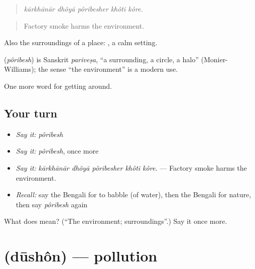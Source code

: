 \begin{quote}
    
\end{quote}

\begin{quote}
\emph{kārkhānār dhõyā pôribesher khôti kôre.}
\end{quote}

\begin{quote}
Factory smoke harms the environment.
\end{quote}

Also the surroundings of a place:  , a calm setting.

\begin{cousinweb}
\textbf{} (\emph{pôribesh}) is Sanskrit \emph{pariveṣa}, \textquotedblleft{}a surrounding, a circle, a halo\textquotedblright{} (Monier-Williams); the sense \textquotedblleft{}the environment\textquotedblright{} is a modern use.
\end{cousinweb}

\begin{grammarlens}[title={What you've built}]
One more word for getting around.
\end{grammarlens}

\subsection*{Your turn}
\begin{itemize}
\raggedright
  \item \emph{Say it:} \emph{pôribesh}
  \item \emph{Say it:} \emph{pôribesh}, once more
  \item \emph{Say it:} \emph{kārkhānār dhõyā pôribesher khôti kôre.} — Factory smoke harms the environment.
  \item \emph{Recall:} say the Bengali for to babble (of water), then the Bengali for nature, then say \emph{pôribesh} again
\end{itemize}

\begin{tcolorbox}[breakable,colback=teal!4,colframe=teal!35!black,title={Before you move on}]
What does  mean? (\textquotedblleft{}The environment; surroundings\textquotedblright{}.) Say it once more.
\end{tcolorbox}
\section[\texorpdfstring{\bn{দূষণ} (dūshôn)}{দূষণ (dūshôn)}]{ (dūshôn) — pollution}

